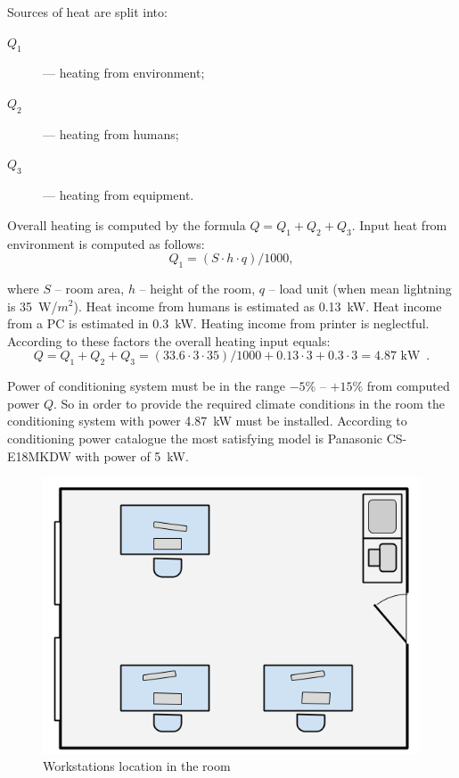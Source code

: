Sources of heat are split into:
\begin{description}
    \item[$Q_1$] --- heating from environment;
    \item[$Q_2$] --- heating from humans;
    \item[$Q_3$] --- heating from equipment.
\end{description}
Overall heating is computed by the formula $Q = Q_1 + Q_2 + Q_3$. Input heat
from environment is computed as follows:
\begin{equation}
Q_1 = (S \cdot h \cdot q) / 1000, 
\end{equation}

where $S$ -- room area, $h$ -- height of the room, $q$ -- load unit (when mean
lightning is 35~W/$m^2$). Heat income from humans is estimated as 0.13~kW. Heat
income from a PC is estimated in 0.3~kW. Heating income from printer is
neglectful. According to these factors the overall heating input equals:
\begin{equation}
Q = Q_1 + Q_2 + Q_3 = (33.6 \cdot 3 \cdot 35) / 1000 + 0.13 \cdot 3 + 0.3 \cdot
3 = 4.87\text{~kW}\enspace.
\end{equation}

Power of conditioning system must be in the range $-5\%$ -- $+15\%$ from
computed power $Q$. So in order to provide the required climate conditions in
the room the conditioning system with power 4.87~kW must be installed. According
to conditioning power catalogue the most satisfying model is Panasonic
CS-E18MKDW with power of 5~kW.

\begin{figure}[htbp]
    \centering
    \includegraphics[scale=0.5]{images/workstation}
    \caption{Workstations location in the room}
    \label{fig:workstation}
\end{figure}

